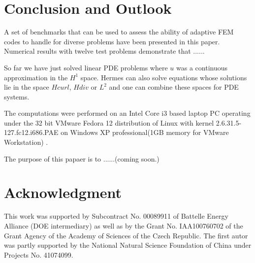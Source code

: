 \section{Conclusion and Outlook}
\label{sec:conclusion}

A set of benchmarks that can be used to assess the
ability of adaptive FEM codes to handle for diverse
problems have been presented in this paper.
Numerical results with twelve test problems demonstrate
that ......

So far we have just solved linear PDE problems where $u$
was a continuous approximation in the $H^1$ space.
Hermes can also solve equations whose solutions lie in the space
$Hcurl$, $Hdiv$ or $L^2$ and one can combine these spaces for PDE systems.

The computations were performed on an Intel Core i3 based laptop PC 
operating under the 32 bit VMware Fedora 12 distribution 
of Linux with kernel 2.6.31.5-127.fc12.i686.PAE 
on Windows XP professional(1GB memory for VMware Workstation) .

The purpose of this papaer is to ......(coming soon.)

\section{Acknowledgment}

This work was supported by Subcontract No. 00089911 of Battelle
Energy Alliance (DOE intermediary) as well as by the
Grant No. IAA100760702 of the Grant Agency of the Academy
of Sciences of the Czech Republic. The first autor was partly
supported by the National Natural Science Foundation
of China under Projects No. 41074099.
